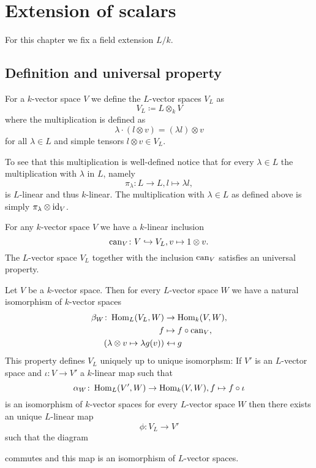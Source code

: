 \chapter{Extension of scalars}\label{app: extension of scalars}
For this chapter we fix a field extension $L/k$.




\section{Definition and universal property}


\begin{defi}
 For a $k$-vector space $V$ we define the $L$-vector spaces $V_L$ as
 \[
  V_L \coloneqq L \otimes_k V
 \]
 where the multiplication is defined as
 \[
  \lambda \cdot (l \otimes v) = (\lambda l) \otimes v
 \]
 for all $\lambda \in L$ and simple tensors $l \otimes v \in V_L$.
\end{defi}

To see that this multiplication is well-defined notice that for every $\lambda \in L$ the multiplication with $\lambda$ in $L$, namely
\[
 \pi_\lambda \colon L \to L, l \mapsto \lambda l,
\]
is $L$-linear and thus $k$-linear. The multiplication with $\lambda \in L$ as defined above is simply $\pi_\lambda \otimes \operatorname{id}_V$.


For any $k$-vector space $V$ we have a $k$-linear inclusion
\[
 \operatorname{can}_V \colon V \hookrightarrow V_L, v \mapsto 1 \otimes v.
\]
The $L$-vector space $V_L$ together with the inclusion $\operatorname{can}_V$ satisfies an universal property.


\begin{thrm}
 Let $V$ be a $k$-vector space. Then for every $L$-vector space $W$ we have a natural isomorphism of $k$-vector spaces
 \begin{align*}
             \beta_W \colon \operatorname{Hom}_L(V_L, W) &\to \operatorname{Hom}_k(V,W), \\
                                         f &\mapsto f \circ \operatorname{can}_V, \\
  (\lambda \otimes v \mapsto \lambda g(v)) &\mapsfrom g
 \end{align*}
 This property defines $V_L$ uniquely up to unique isomorphsm: If $V'$ is an $L$-vector space and $\iota \colon V \to V'$ a $k$-linear map such that
 \[
  \alpha_W \colon \operatorname{Hom}_L(V', W) \to \operatorname{Hom}_k(V,W), f \mapsto f \circ \iota
 \]
 is an isomorphism of $k$-vector spaces for every $L$-vector space $W$ then there exists an unique $L$-linear map
 \[
  \phi \colon V_L \to V'
 \]
 such that the diagram
 \begin{center}
 \end{center}
 commutes and this map is an isomorphism of $L$-vector spaces.
\end{thrm}


